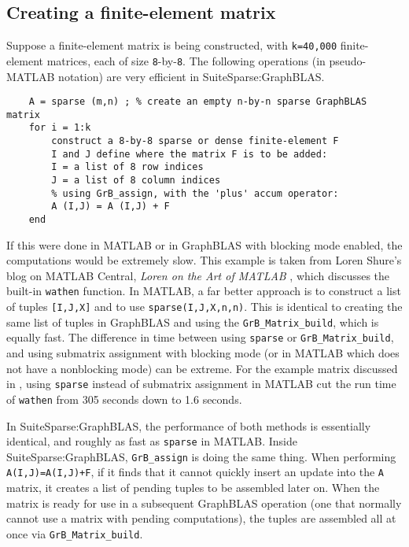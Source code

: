 \documentclass[12pt]{article}
\begin{document}
\newpage
\subsection{Creating a finite-element matrix}
\label{fem}

Suppose a finite-element matrix is being constructed, with \verb'k=40,000'
finite-element matrices, each of size \verb'8'-by-\verb'8'.  The following
operations (in pseudo-MATLAB notation) are very efficient in
SuiteSparse:GraphBLAS.

    {\footnotesize
    \begin{verbatim}
    A = sparse (m,n) ; % create an empty n-by-n sparse GraphBLAS matrix
    for i = 1:k
        construct a 8-by-8 sparse or dense finite-element F
        I and J define where the matrix F is to be added:
        I = a list of 8 row indices
        J = a list of 8 column indices
        % using GrB_assign, with the 'plus' accum operator:
        A (I,J) = A (I,J) + F 
    end \end{verbatim}}

If this were done in MATLAB or in GraphBLAS with blocking mode enabled, the
computations would be extremely slow.  This example is taken from Loren Shure's
blog on MATLAB Central, {\em Loren on the Art of MATLAB} \cite{Davis07},
which discusses the built-in \verb'wathen' function.  In
MATLAB, a far better approach is to construct a list of tuples \verb'[I,J,X]'
and to use \verb'sparse(I,J,X,n,n)'. This is identical to creating the same
list of tuples in GraphBLAS and using the \verb'GrB_Matrix_build', which is
equally fast.  The difference in time between using \verb'sparse' or
\verb'GrB_Matrix_build', and using submatrix assignment with blocking mode (or
in MATLAB which does not have a nonblocking mode) can be extreme.  For the
example matrix discussed in \cite{Davis07}, using \verb'sparse' instead of
submatrix assignment in MATLAB cut the run time of \verb'wathen' from 305
seconds down to 1.6 seconds.

In SuiteSparse:GraphBLAS, the performance of both methods is essentially
identical, and roughly as fast as \verb'sparse' in MATLAB.  Inside
SuiteSparse:GraphBLAS, \verb'GrB_assign' is doing the same thing. When
performing \verb'A(I,J)=A(I,J)+F', if it finds that it cannot quickly insert an
update into the \verb'A' matrix, it creates a list of pending tuples to be
assembled later on.   When the matrix is ready for use in a subsequent
GraphBLAS operation (one that normally cannot use a matrix with pending
computations), the tuples are assembled all at once via
\verb'GrB_Matrix_build'.
\end{document}
